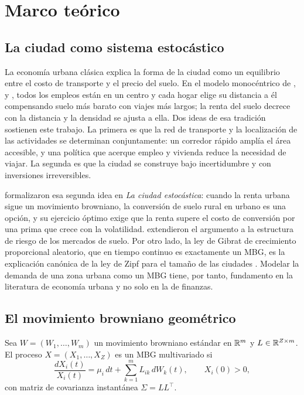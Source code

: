 \chapter{Marco teórico}\label{cap:marco}

\section{La ciudad como sistema estocástico}

La economía urbana clásica explica la forma de la ciudad como un equilibrio entre el costo de
transporte y el precio del suelo. En el modelo monocéntrico de \citet{alonso1964}, \citet{mills1967} y
\citet{muth1969}, todos los empleos están en un centro y cada hogar elige su distancia a él
compensando suelo más barato con viajes más largos; la renta del suelo decrece con la distancia y la
densidad se ajusta a ella. Dos ideas de esa tradición sostienen este trabajo. La primera es que la red
de transporte y la localización de las actividades se determinan conjuntamente: un corredor rápido
amplía el área accesible, y una política que acerque empleo y vivienda reduce la necesidad de
viajar. La segunda es que la ciudad se construye bajo incertidumbre y con inversiones irreversibles.

\citet{capozza1990} formalizaron esa segunda idea en \emph{La ciudad estocástica}: cuando la renta
urbana sigue un movimiento browniano, la conversión de suelo rural en urbano es una opción, y su
ejercicio óptimo exige que la renta supere el costo de conversión por una prima que crece con la
volatilidad. \citet{capozza1994} extendieron el argumento a la estructura de riesgo de los mercados de
suelo. Por otro lado, la ley de Gibrat de crecimiento proporcional aleatorio, que en tiempo continuo
es exactamente un MBG, es la explicación canónica de la ley de Zipf para el tamaño de las ciudades
\citep{gabaix1999}. Modelar la demanda de una zona urbana como un MBG tiene, por tanto, fundamento en la
literatura de economía urbana y no solo en la de finanzas.

\section{El movimiento browniano geométrico}

\begin{definition}
Sea $W=(W_1,\dots,W_m)$ un movimiento browniano estándar en $\mathbb{R}^m$ y $L\in\mathbb{R}^{Z\times m}$. El proceso
$X=(X_1,\dots,X_Z)$ es un MBG multivariado si
\begin{equation}\label{eq:mbg}
\frac{dX_i(t)}{X_i(t)}=\mu_i\,dt+\sum_{k=1}^{m}L_{ik}\,dW_k(t),\qquad X_i(0)>0,
\end{equation}
con matriz de covarianza instantánea $\Sigma=LL^\top$.
\end{definition}

